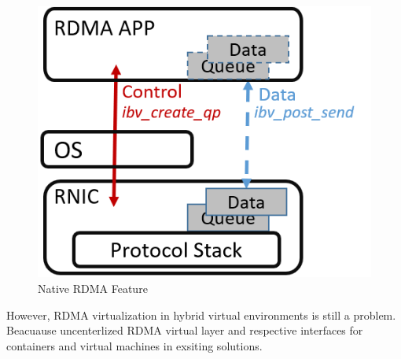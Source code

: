 \begin{figure}[!ht]
	\centering
	\includegraphics[width=1.0\linewidth]{images/rdma-feat}
	\caption{Native RDMA Feature}
	\label{fig:rdma-feat}
\end{figure}



However, RDMA virtualization in hybrid virtual environments is still a problem. Beacuause uncenterlized RDMA virtual layer and respective interfaces for containers and virtual machines in exsiting solutions. 

